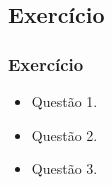 \subsection[Exercício]{Exercício}\label{subsec:sec04-exercicio}



\begin{frame}[t]\frametitle{Exercício}

\begin{itemize}
  \justifying{}
  \setlength\itemsep{1em}
  \item Questão 1.
  \item Questão 2.
  \item Questão 3.
\end{itemize}

\end{frame}
